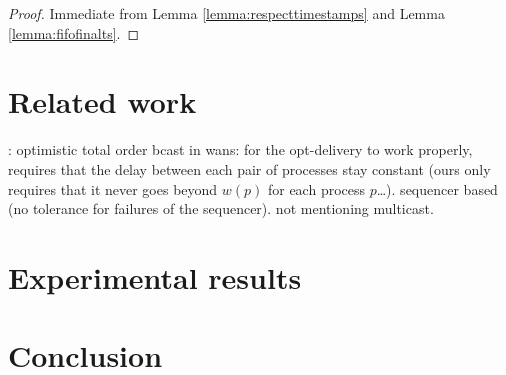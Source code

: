 \documentclass[times, 10pt]{article}
\begin{document}
\begin{proof}
Immediate from Lemma \ref{lemma:respecttimestamps} and Lemma \ref{lemma:fifofinalts}.
\end{proof}

\section{Related work}

\cite{sousa2002oto}: optimistic total order bcast in wans: for the opt-delivery to work properly, requires that the delay between each pair of processes stay constant (ours only requires that it never goes beyond $w(p)$ for each process $p$\ldots). sequencer based (no tolerance for failures of the sequencer). not mentioning multicast.

\section{Experimental results}

\section{Conclusion}

%
%


\end{document}
